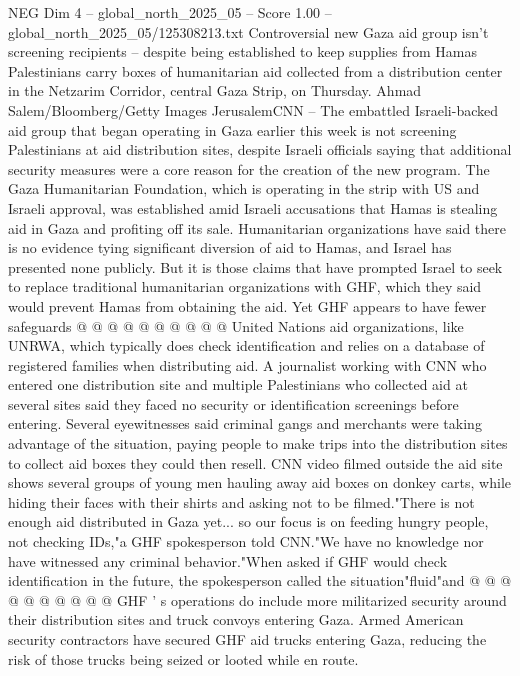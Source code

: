 \begin{textsample}{NEG Dim 4 – global\_north\_2025\_05 – Score 1.00 – global\_north\_2025\_05/125308213.txt}  \label{ex:f4_neg_245}
Controversial new Gaza aid group isn't screening recipients -- despite being established to keep supplies from Hamas Palestinians carry boxes of humanitarian aid collected from a distribution center in the Netzarim Corridor, central Gaza Strip, on Thursday.
Ahmad Salem/Bloomberg/Getty Images JerusalemCNN -- The embattled Israeli-backed aid group that began operating in Gaza earlier this week is not screening Palestinians at aid distribution sites, despite Israeli officials saying that additional security measures were a core reason for the creation of the new program.
The Gaza Humanitarian Foundation, which is operating in the strip with US and Israeli approval, was established amid Israeli accusations that Hamas is stealing aid in Gaza and profiting off its sale.
Humanitarian organizations have said there is no evidence tying significant diversion of aid to Hamas, and Israel has presented none publicly.
But it is those claims that have prompted Israel to seek to replace traditional humanitarian organizations with GHF, which they said would prevent Hamas from obtaining the aid.
Yet GHF appears to have fewer safeguards @ @ @ @ @ @ @ @ @ @ United Nations aid organizations, like UNRWA, which typically does check identification and relies on a database of registered families when distributing aid.
A journalist working with CNN who entered one distribution site and multiple Palestinians who collected aid at several sites said they faced no security or identification screenings before entering.
Several eyewitnesses said criminal gangs and merchants were taking advantage of the situation, paying people to make trips into the distribution sites to collect aid boxes they could then resell.
CNN video filmed outside the aid site shows several groups of young men hauling away aid boxes on donkey carts, while hiding their faces with their shirts and asking not to be filmed."There is not enough aid distributed in Gaza yet... so our focus is on feeding hungry people, not checking IDs,"a GHF spokesperson told CNN."We have no knowledge nor have witnessed any criminal behavior."When asked if GHF would check identification in the future, the spokesperson called the situation"fluid"and @ @ @ @ @ @ @ @ @ @ GHF ' s operations do include more militarized security around their distribution sites and truck convoys entering Gaza.
Armed American security contractors have secured GHF aid trucks entering Gaza, reducing the risk of those trucks being seized or looted while en route.

\end{textsample}
